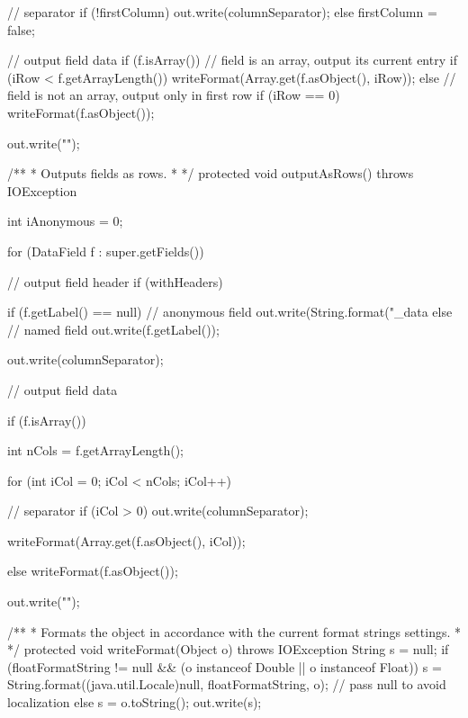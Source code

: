 \begin{code}
\begin{hide}
{{{            // separator
            if (!firstColumn)
               out.write(columnSeparator);
            else
               firstColumn = false;

            // output field data
            if (f.isArray()) {
               // field is an array, output its current entry
               if (iRow < f.getArrayLength())
                  writeFormat(Array.get(f.asObject(), iRow));
            }
            else {
               // field is not an array, output only in first row
               if (iRow == 0)
                  writeFormat(f.asObject());
            }
         }
         out.write("\n");
      }
   }
 
   
   /**
    * Outputs fields as rows.
    *
    */
   protected void outputAsRows() throws IOException {

      int iAnonymous = 0;

      for (DataField f : super.getFields()) {

         // output field header
         if (withHeaders) {
            if (f.getLabel() == null)
               // anonymous field
               out.write(String.format("_data%
            else
               // named field
               out.write(f.getLabel());            

            out.write(columnSeparator);
         }
         
         // output field data

         if (f.isArray()) {

            int nCols = f.getArrayLength();

            for (int iCol = 0; iCol < nCols; iCol++) {

               // separator
               if (iCol > 0)
                  out.write(columnSeparator);
               
               writeFormat(Array.get(f.asObject(), iCol));
            }
         }
         else {
            writeFormat(f.asObject());
         }
         
         out.write("\n");

      }
   }
   
   /**
    * Formats the object in accordance with the current format strings settings.
    *
    */
   protected void writeFormat(Object o) throws IOException {
      String s = null;
      if (floatFormatString != null && (o instanceof Double || o instanceof Float))
         s = String.format((java.util.Locale)null, floatFormatString, o); // pass null to avoid localization
      else
         s = o.toString();
      out.write(s);
   }\end{hide}
\end{code}

